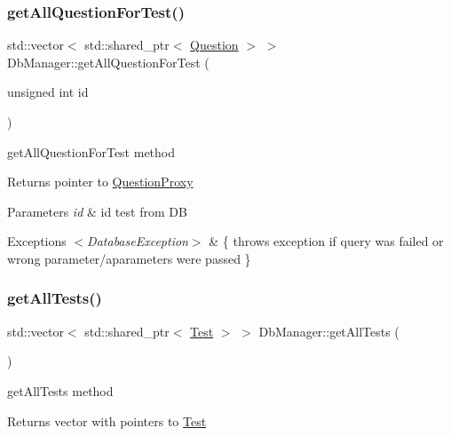\subsubsection{\texorpdfstring{get\+All\+Question\+For\+Test()}{getAllQuestionForTest()}}
{\footnotesize\ttfamily std\+::vector$<$ std\+::shared\+\_\+ptr$<$ \hyperlink{class_question}{Question} $>$ $>$ Db\+Manager\+::get\+All\+Question\+For\+Test (\begin{DoxyParamCaption}\item[{unsigned int}]{id }\end{DoxyParamCaption})}



get\+All\+Question\+For\+Test method 

\begin{DoxyReturn}{Returns}
pointer to \hyperlink{class_question_proxy}{Question\+Proxy} 
\end{DoxyReturn}

\begin{DoxyParams}{Parameters}
{\em id} & id test from DB \\
\hline
\end{DoxyParams}

\begin{DoxyExceptions}{Exceptions}
{\em $<$\+Database\+Exception$>$} & \{ throws exception if query was failed or wrong parameter/aparameters were passed \} \\
\hline
\end{DoxyExceptions}
\mbox{\label{class_db_manager_a8f581529cc754936b6a218723bc29d03}} 
\subsubsection{\texorpdfstring{get\+All\+Tests()}{getAllTests()}}
{\footnotesize\ttfamily std\+::vector$<$ std\+::shared\+\_\+ptr$<$ \hyperlink{class_test}{Test} $>$ $>$ Db\+Manager\+::get\+All\+Tests (\begin{DoxyParamCaption}{ }\end{DoxyParamCaption})}



get\+All\+Tests method 

\begin{DoxyReturn}{Returns}
vector with pointers to \hyperlink{class_test}{Test} 
\end{DoxyReturn}

